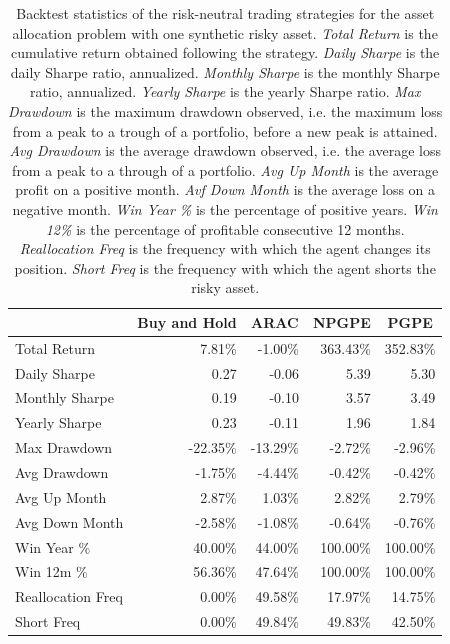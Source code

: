 \begin{table}[t!]
\centering
\begin{tabular}{@{}lrrrr@{}}
\toprule
 & \multicolumn{1}{c}{Buy and Hold} & \multicolumn{1}{c}{ARAC} & \multicolumn{1}{c}{NPGPE} & \multicolumn{1}{c}{PGPE} \\ \midrule
Total Return      & 7.81\%       & -1.00\%  & 363.43\% & 352.83\% \\
Daily Sharpe      & 0.27         & -0.06    & 5.39     & 5.30     \\
Monthly Sharpe    & 0.19         & -0.10    & 3.57     & 3.49     \\
Yearly Sharpe     & 0.23         & -0.11    & 1.96     & 1.84     \\
Max Drawdown      & -22.35\%     & -13.29\% & -2.72\%  & -2.96\%  \\
Avg Drawdown      & -1.75\%      & -4.44\%  & -0.42\%  & -0.42\%  \\
Avg Up Month      & 2.87\%       & 1.03\%   & 2.82\%   & 2.79\%   \\
Avg Down Month    & -2.58\%      & -1.08\%  & -0.64\%  & -0.76\%  \\
Win Year \%       & 40.00\%      & 44.00\%  & 100.00\% & 100.00\% \\
Win 12m \%        & 56.36\%      & 47.64\%  & 100.00\% & 100.00\% \\
Reallocation Freq & 0.00\%       & 49.58\%  & 17.97\%  & 14.75\%  \\
Short Freq        & 0.00\%       & 49.84\%  & 49.83\%  & 42.50\%  \\ \bottomrule
\end{tabular}
\caption[Backtest statistics for risk-neutral learning with one synthetic risky asset.]{Backtest statistics of the risk-neutral trading strategies for the asset allocation problem with one synthetic risky asset. \emph{Total Return} is the cumulative return obtained following the strategy. \emph{Daily Sharpe} is the daily Sharpe ratio, annualized. \emph{Monthly Sharpe} is the monthly Sharpe ratio, annualized. \emph{Yearly Sharpe} is the yearly Sharpe ratio. \emph{Max Drawdown} is the maximum drawdown observed, i.e. the maximum loss from a peak to a trough of a portfolio, before a new peak is attained. \emph{Avg Drawdown} is the average drawdown observed, i.e. the average loss from a peak to a through of a portfolio. \emph{Avg Up Month} is the average profit on a positive month. \emph{Avf Down Month} is the average loss on a negative month. \emph{Win Year \%} is the percentage of positive years. \emph{Win 12\%} is the percentage of profitable consecutive 12 months. \emph{Reallocation Freq} is the frequency with which the agent changes its position. \emph{Short Freq} is the frequency with which the agent shorts the risky asset.}
\label{tab:single_synthetic_neutral_performance}
\end{table}

